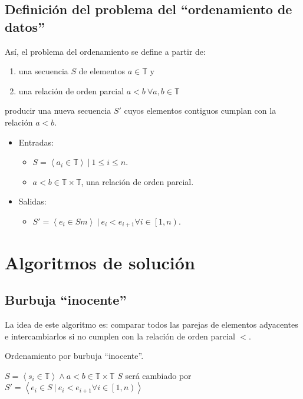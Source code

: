 \documentclass[letter]{article}
\begin{document}
\subsection{Definición del problema del ``ordenamiento de datos''} \label{problema}
Así, el problema del ordenamiento se define a partir de:
  \begin{enumerate}
    \item una secuencia $S$ de elementos $a\in \mathbb{T}$ y
    \item una relación de orden parcial $a<b~\forall a,b\in \mathbb{T}$
  \end{enumerate}
producir una nueva secuencia $S'$ cuyos elementos contiguos cumplan con la relación $a<b$.
\begin{itemize}
    \item Entradas:
    \begin{itemize}
        \item $S = \left< a_i \in \mathbb{T} \right> ~ | ~ 1\le i \le n$.
        \item $a<b \in \mathbb{T} \times \mathbb{T}$, una relación de orden parcial.
    \end{itemize}
    \item Salidas:
    \begin{itemize}
        \item $S' = \left< e_i \in S m\right> ~ | ~ e_i < e_{i+1} \forall i \in \left[1,n\right)$.
    \end{itemize}
\end{itemize}

\section{Algoritmos de solución} \label{algoritmos}
\subsection{Burbuja ``inocente''} \label{algoritmos:inocente}
La idea de este algoritmo es: comparar todos las parejas de elementos adyacentes e intercambiarlos si no cumplen con la relación de orden parcial $<$.

\begin{algorithm}[!htb]
\caption{Ordenamiento por burbuja ``inocente''.}
\begin{algorithmic}[1]
\Require $S=\left< s_i \in \mathbb{T} \right> \land a<b \in \mathbb{T} \times \mathbb{T}$
\Ensure $S$ será cambiado por $S' = \left< e_i \in S  ~ | ~ e_i < e_{i+1} \forall i \in \left[1,n\right)\right>$
        \State {}
      \EndIf
    \EndFor
  \EndFor
\EndProcedure
\end{algorithmic}
\end{algorithm}
\end{document}
